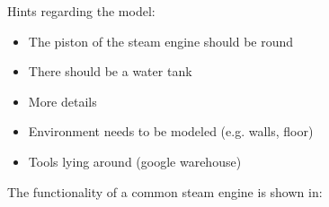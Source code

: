 \documentclass{scrartcl}
\begin{document}
Hints regarding the model:
\begin{itemize}
	\item The piston of the steam engine should be round
	\item There should be a water tank
	\item More details
	\item Environment needs to be modeled (e.g. walls, floor)
	\item Tools lying around (google warehouse)
\end{itemize}
The functionality of a common steam engine is shown in:

% 
 
\end{document}
